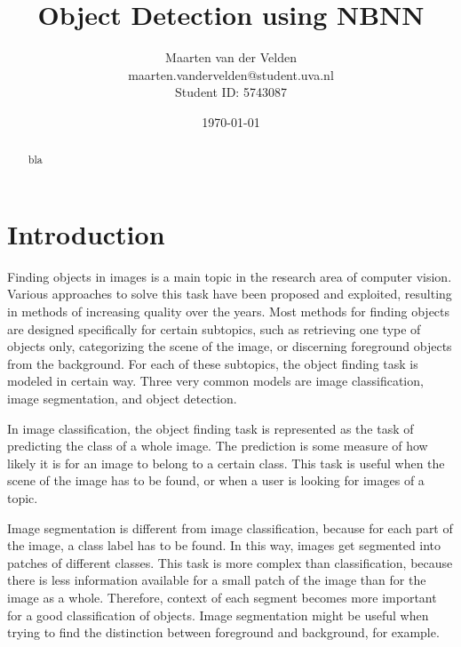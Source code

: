 \documentclass[a4paper,10pt]{article}
\title{Object Detection using NBNN}
\author{Maarten van der Velden\\maarten.vandervelden@student.uva.nl\\Student ID: 5743087}
\date{\today}
\begin{document}
\begin{titlepage}
    \vspace{10cm}
    \maketitle
    \thispagestyle{empty}
\end{titlepage}


\begin{abstract}
    bla
\end{abstract}

\section{Introduction} %
\label{sec:introduction}

Finding objects in images is a main topic in the research area of computer vision. Various approaches to solve this task have been proposed and exploited, resulting in methods of increasing quality over the years. Most methods for finding objects are designed specifically for certain subtopics, such as retrieving one type of objects only, categorizing the scene of the image, or discerning foreground objects from the background. For each of these subtopics, the object finding task is modeled in certain way. Three very common models are image classification, image segmentation, and object detection.

In image classification, the object finding task is represented as the task of predicting the class of a whole image. The prediction is some measure of how likely it is for an image to belong to a certain class. This task is useful when the scene of the image has to be found, or when a user is looking for images of a topic.

Image segmentation is different from image classification, because for each part of the image, a class label has to be found. In this way, images get segmented into patches of different classes. This task is more complex than classification, because there is less information available for a small patch of the image than for the image as a whole. Therefore, context of each segment becomes more important for a good classification of objects. Image segmentation might be useful when trying to find the distinction between foreground and background, for example.
\end{document}
